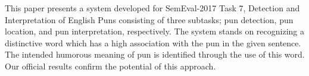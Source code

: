 This paper presents a system developed for SemEval-2017 Task 7, Detection and Interpretation of English Puns consisting of three subtasks; pun detection, pun location, and pun interpretation, respectively. The system stands on recognizing a distinctive word which has a high association with the pun in the given sentence. The intended humorous meaning of pun is identified through the use of this word. Our official results confirm the potential of this approach.
